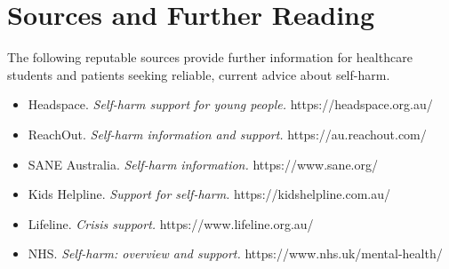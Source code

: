 \section*{Sources and Further Reading}
The following reputable sources provide further information for healthcare students and patients seeking reliable, current advice about self-harm.

\begin{itemize}
    \item Headspace. \textit{Self-harm support for young people.} https://headspace.org.au/
    \item ReachOut. \textit{Self-harm information and support.} https://au.reachout.com/
    \item SANE Australia. \textit{Self-harm information.} https://www.sane.org/
    \item Kids Helpline. \textit{Support for self-harm.} https://kidshelpline.com.au/
    \item Lifeline. \textit{Crisis support.} https://www.lifeline.org.au/
    \item NHS. \textit{Self-harm: overview and support.} https://www.nhs.uk/mental-health/
\end{itemize}
